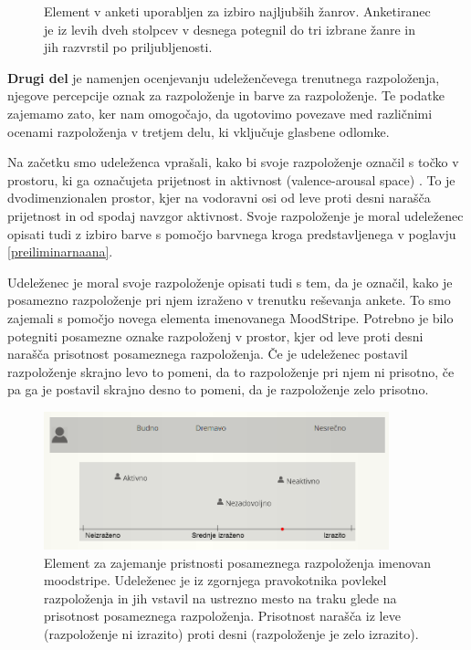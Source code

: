 \documentclass[a4paper, 12pt]{book}
\begin{document}
{\begin{figure}[h!t]
\caption{Element v anketi uporabljen za izbiro najljubših žanrov. Anketiranec je iz levih dveh stolpcev v desnega potegnil do tri izbrane žanre in jih razvrstil po priljubljenosti.}
\label{genresel}
\end{figure}

\textbf{Drugi del} je namenjen ocenjevanju udeleženčevega trenutnega razpoloženja, njegove percepcije oznak za razpoloženje in barve za razpoloženje. Te podatke zajemamo zato, ker nam omogočajo, da ugotovimo povezave med različnimi ocenami razpoloženja v tretjem delu, ki vključuje glasbene odlomke.

Na začetku smo udeleženca vprašali, kako bi svoje razpoloženje označil s točko v prostoru, ki ga označujeta prijetnost in aktivnost (valence-arousal space) \cite{Colibazzi2010}. To je dvodimenzionalen prostor, kjer na vodoravni osi od leve proti desni narašča prijetnost in od spodaj navzgor aktivnost. Svoje razpoloženje je moral udeleženec opisati tudi z izbiro barve s pomočjo barvnega kroga predstavljenega v poglavju \ref{preiliminarnaana}. 

Udeleženec je moral svoje razpoloženje opisati tudi s tem, da je označil, kako je posamezno razpoloženje pri njem izraženo v trenutku reševanja ankete. To smo zajemali s pomočjo novega elementa imenovanega MoodStripe. Potrebno je bilo potegniti posamezne oznake razpoloženj v prostor, kjer od leve proti desni narašča prisotnost posameznega razpoloženja. Če je udeleženec postavil razpoloženje skrajno levo to pomeni, da to razpoloženje pri njem ni prisotno, če pa ga je postavil skrajno desno to pomeni, da je razpoloženje zelo prisotno.

\begin{figure}[ht]
\centering
\includegraphics[width=10cm]{images/moodstripe.png}

\caption{Element za zajemanje pristnosti posameznega razpoloženja imenovan moodstripe. Udeleženec je iz zgornjega pravokotnika povlekel razpoloženja in jih vstavil na ustrezno mesto na traku glede na prisotnost posameznega razpoloženja. Prisotnost narašča iz leve (razpoloženje ni izrazito) proti desni (razpoloženje je zelo izrazito). }
\label{moodstripe}
\end{figure}

}
\end{document}
